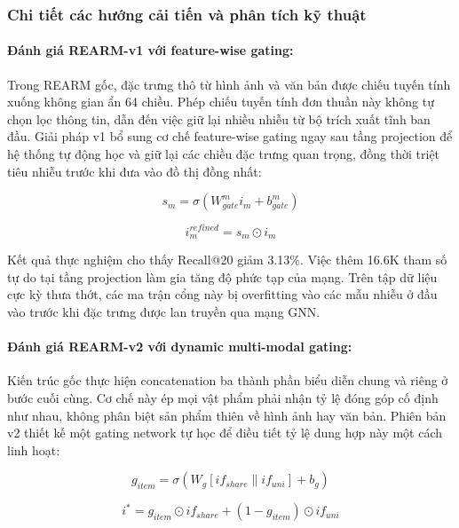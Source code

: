 \begin{longtable}
\subsubsection{Chi tiết các hướng cải tiến và phân tích kỹ thuật}

\paragraph{Đánh giá REARM-v1 với feature-wise gating:}
Trong REARM gốc, đặc trưng thô từ hình ảnh và văn bản được chiếu tuyến tính xuống không gian ẩn 64 chiều. Phép chiếu tuyến tính đơn thuần này không tự chọn lọc thông tin, dẫn đến việc giữ lại nhiều nhiễu từ bộ trích xuất tĩnh ban đầu. Giải pháp v1 bổ sung cơ chế feature-wise gating ngay sau tầng projection để hệ thống tự động học và giữ lại các chiều đặc trưng quan trọng, đồng thời triệt tiêu nhiễu trước khi đưa vào đồ thị đồng nhất:

\begin{equation}
s_m = \sigma(W_{gate}^m i_m + b_{gate}^m)
\end{equation}

\begin{equation}
i_m^{refined} = s_m \odot i_m
\end{equation}

Kết quả thực nghiệm cho thấy Recall@20 giảm 3.13\%. Việc thêm 16.6K tham số tự do tại tầng projection làm gia tăng độ phức tạp của mạng. Trên tập dữ liệu cực kỳ thưa thớt, các ma trận cổng này bị overfitting vào các mẫu nhiễu ở đầu vào trước khi đặc trưng được lan truyền qua mạng GNN.

\paragraph{Đánh giá REARM-v2 với dynamic multi-modal gating:}
Kiến trúc gốc thực hiện concatenation ba thành phần biểu diễn chung và riêng ở bước cuối cùng. Cơ chế này ép mọi vật phẩm phải nhận tỷ lệ đóng góp cố định như nhau, không phân biệt sản phẩm thiên về hình ảnh hay văn bản. Phiên bản v2 thiết kế một gating network tự học để điều tiết tỷ lệ dung hợp này một cách linh hoạt:

\begin{equation}
g_{item} = \sigma(W_g [if_{share} \parallel if_{uni}] + b_g)
\end{equation}

\begin{equation}
i^* = g_{item} \odot if_{share} + (1 - g_{item}) \odot if_{uni}
\end{equation}


\end{longtable}
